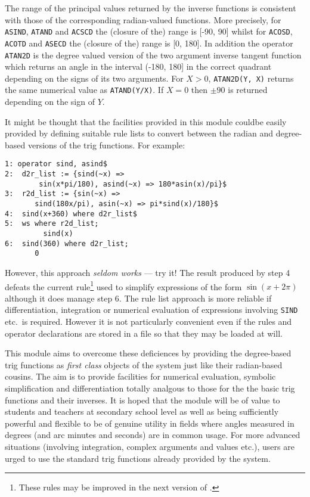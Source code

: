 The range of the principal values returned by the inverse functions is consistent with those of the corresponding radian-valued functions. More precisely, for \texttt{ASIND}, \texttt{ATAND} and  \texttt{ACSCD}  the (closure of the) range is [-90, 90] whilst for \texttt{ACOSD}, \texttt{ACOTD} and  \texttt{ASECD}  the (closure of the) range is [0, 180].  In addition the operator \texttt{ATAN2D} is the degree valued version of the two argument inverse tangent function which returns an angle in the interval (-180, 180] in the correct quadrant depending on the signs of its two arguments.  For $X>0$,  \texttt{ATAN2D(Y, X)} returns the same numerical value as  \texttt{ATAND(Y/X)}. If $X=0$ then $\pm 90$ is returned depending on the sign of $Y$.

It might be thought that the facilities provided in this module couldbe easily provided by defining suitable rule lists to convert between the radian and degree-based versions of the trig functions.  For example:
\begin{verbatim}
1: operator sind, asind$
2:  d2r_list := {sind(~x) =>
        sin(x*pi/180), asind(~x) => 180*asin(x)/pi}$ 
3:  r2d_list := {sin(~x) => 
       sind(180x/pi), asin(~x) => pi*sind(x)/180}$
4:  sind(x+360) where d2r_list$
5:  ws where r2d_list;
         sind(x)
6:  sind(360) where d2r_list;
       0
\end{verbatim}

However, this approach \emph{seldom works} --- try it! The result produced by step 4 defeats the current rule\footnote{These rules may be improved in the next version of {\REDUCE}.} 
used to simplify expressions of the form $\sin(x+2\pi)$  although it does manage step 6.  
The rule list approach is more reliable if differentiation, integration or numerical evaluation of expressions involving \texttt{SIND} etc.\  is required.  However it is not particularly convenient even if the rules  and operator declarations are stored in a file so that they may be loaded at will.

This module aims to overcome these deficiences by providing the degree-based trig  functions as \emph{first class} objects of the system just like their radian-based cousins. The aim is to provide facilities for numerical evaluation, symbolic simplification and differentiation totally analgous to those for the the basic trig functions and their inverses.  It is hoped that the module will be of value to students and teachers at secondary school level as well as being sufficiently powerful and flexible to be of genuine utility in fields where angles measured in degrees (and  arc minutes and seconds) are in common usage.  For more advanced situations (involving integration, complex arguments and values etc.),  users are urged to use the standard trig  functions already provided by the system.

